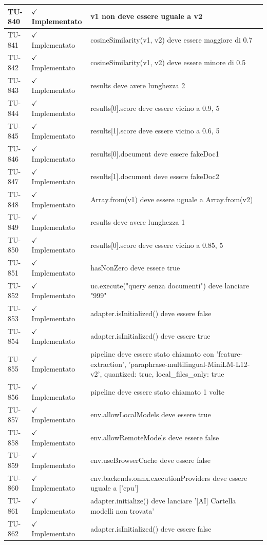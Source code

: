 ﻿\documentclass[a4paper,12pt]{article}
\newcommand{\ok}{\textcolor{green!60!black}{$\checkmark$ Implementato}}
\begin{document}
\begin{longtable}{|p{2cm}|p{3.5cm}|p{9.5cm}|}
\hline
TU-840 & \ok & v1 non deve essere uguale a v2 \\
\hline
TU-841 & \ok & cosineSimilarity(v1, v2) deve essere maggiore di 0.7 \\
\hline
TU-842 & \ok & cosineSimilarity(v1, v2) deve essere minore di 0.5 \\
\hline
TU-843 & \ok & results deve avere lunghezza 2 \\
\hline
TU-844 & \ok & results[0].score deve essere vicino a 0.9, 5 \\
\hline
TU-845 & \ok & results[1].score deve essere vicino a 0.6, 5 \\
\hline
TU-846 & \ok & results[0].document deve essere fakeDoc1 \\
\hline
TU-847 & \ok & results[1].document deve essere fakeDoc2 \\
\hline
TU-848 & \ok & Array.from(v1) deve essere uguale a Array.from(v2) \\
\hline
TU-849 & \ok & results deve avere lunghezza 1 \\
\hline
TU-850 & \ok & results[0].score deve essere vicino a 0.85, 5 \\
\hline
TU-851 & \ok & hasNonZero deve essere true \\
\hline
TU-852 & \ok & uc.execute("query senza documenti") deve lanciare "999" \\
\hline
TU-853 & \ok & adapter.isInitialized() deve essere false \\
\hline
TU-854 & \ok & adapter.isInitialized() deve essere true \\
\hline
TU-855 & \ok & pipeline deve essere stato chiamato con 'feature-extraction', 'paraphrase-multilingual-MiniLM-L12-v2', { quantized: true, local\_files\_only: true } \\
\hline
TU-856 & \ok & pipeline deve essere stato chiamato 1 volte \\
\hline
TU-857 & \ok & env.allowLocalModels deve essere true \\
\hline
TU-858 & \ok & env.allowRemoteModels deve essere false \\
\hline
TU-859 & \ok & env.useBrowserCache deve essere false \\
\hline
TU-860 & \ok & env.backends.onnx.executionProviders deve essere uguale a ['cpu'] \\
\hline
TU-861 & \ok & adapter.initialize() deve lanciare '[AI] Cartella modelli non trovata' \\
\hline
TU-862 & \ok & adapter.isInitialized() deve essere false \\

\end{longtable}
\end{document}
